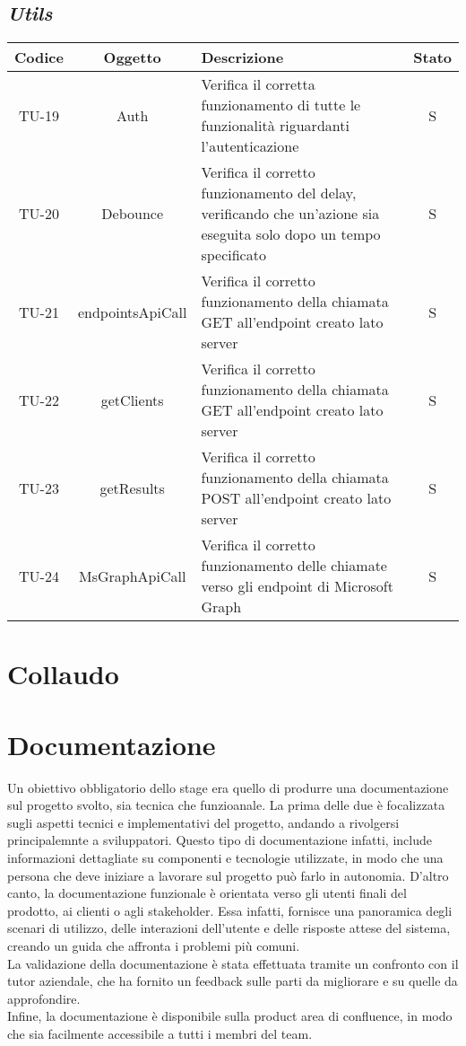 \subsection*{\emph{Utils}}


\begin{center}
  \label{tab:test-unita-utils}
  \begin{longtable}{|c|c|p{}|c|}
  \hline
  \textbf{Codice} & \textbf{Oggetto} & \textbf{Descrizione} & \textbf{Stato}\\
  \hline
  TU-19 &Auth &Verifica il corretta funzionamento di tutte le funzionalità riguardanti l'autenticazione & S \\
  \hline
  TU-20 &Debounce &Verifica il corretto funzionamento del delay, verificando che un'azione sia eseguita solo dopo un tempo specificato &S \\
  \hline
  TU-21 &endpointsApiCall &Verifica il corretto funzionamento della chiamata GET all'endpoint creato lato server &S \\
  \hline
  TU-22 &getClients &Verifica il corretto funzionamento della chiamata GET all'endpoint creato lato server  &S \\
  \hline
  TU-23 &getResults &Verifica il corretto funzionamento della chiamata POST all'endpoint creato lato server &S \\
  \hline
  TU-24 &MsGraphApiCall &Verifica il corretto funzionamento delle chiamate verso gli endpoint di Microsoft Graph &S \\
  \hline
\end{longtable}
\end{center}



\section{Collaudo}
\section{Documentazione}
Un obiettivo obbligatorio dello stage era quello di produrre una documentazione sul progetto svolto, sia tecnica che funzioanale.
La prima delle due è focalizzata sugli aspetti tecnici e implementativi del progetto, andando a rivolgersi principalemnte a sviluppatori.
Questo tipo di documentazione infatti, include informazioni dettagliate su componenti e tecnologie utilizzate, in modo che una persona che deve iniziare a lavorare sul progetto
può farlo in autonomia.
D'altro canto, la documentazione funzionale è orientata verso gli utenti finali del prodotto, ai clienti o agli stakeholder.
Essa infatti, fornisce una panoramica degli scenari di utilizzo, delle interazioni dell'utente e delle risposte attese del sistema, creando un guida che affronta i problemi più comuni.\\
La validazione della documentazione è stata effettuata tramite un confronto con il tutor aziendale, che ha fornito un feedback sulle parti da migliorare e su quelle da approfondire.\\
Infine, la documentazione è disponibile sulla product area di confluence, in modo che sia facilmente accessibile a tutti i membri del team.

